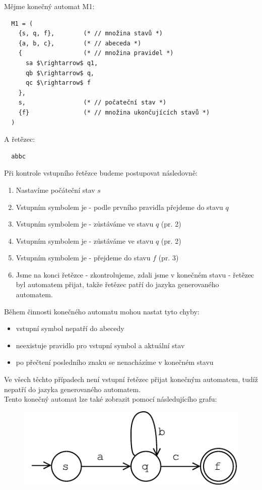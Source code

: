 \begin{exmp}
  Mějme konečný automat M1:
  \begin{lstlisting}
  M1 = (
    {s, q, f},        (* // množina stavů *)
    {a, b, c},        (* // abeceda *)
    {                 (* // množina pravidel *)
      sa $\rightarrow$ q1,
      qb $\rightarrow$ q,
      qc $\rightarrow$ f
    },
    s,                (* // počateční stav *)
    {f}               (* // množina ukončujících stavů *)
  )
  \end{lstlisting}
  A řetězec:
\begin{lstlisting}
  abbc
\end{lstlisting}

\noindent
Při kontrole vstupního řetězce budeme postupovat následovně:

\begin{enumerate}
  \item Nastavíme počáteční stav $s$
  \item Vstupním symbolem je  - podle prvního pravidla přejdeme do stavu $q$
  \item Vstupním symbolem je  - zůstáváme ve stavu $q$ (pr. 2)
  \item Vstupním symbolem je  - zůstáváme ve stavu $q$ (pr. 2)
  \item Vstupním symbolem je  - přejdeme do stavu $f$ (pr. 3)
  \item Jsme na konci řetězce - zkontrolujeme, zdali jsme v konečném stavu - řetězec byl automatem přijat,
  takže řetězec patří do jazyka generovaného automatem.
\end{enumerate}

\noindent
Během činnosti konečného automatu mohou nastat tyto chyby:

\begin{itemize}
  \item vstupní symbol nepatří do abecedy
  \item neexistuje pravidlo pro vstupní symbol a aktuální stav
  \item po přečtení posledního znaku se nenacházíme v konečném stavu
\end{itemize}
Ve všech těchto případech není vstupní řetězec přijat konečným automatem, tudíž nepatří
do jazyka generovaného automatem.\\

\noindent
Tento konečný automat lze také zobrazit pomocí následujícího grafu:

\begin{figure}[H]
  \centering
  \includegraphics{fig/finiteAutomat.pdf}
\end{figure}

\end{exmp}


